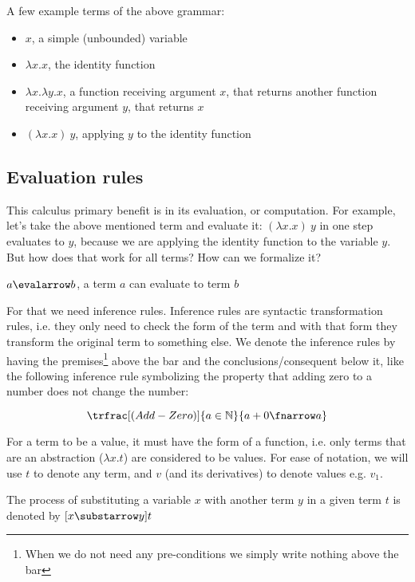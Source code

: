 A few example terms of the above grammar:

\begin{itemize}
       \item $x$, a simple (unbounded) variable
       \item $\lambda x.x$, the identity function
       \item $\lambda x.\lambda y.x$, a function receiving argument $x$, that returns another function receiving argument $y$, that returns $x$
       \item $(\lambda x.x)\ y$, applying $y$ to the identity function
\end{itemize}

\subsection{Evaluation rules}
\label{evaluation-rules}

This calculus primary benefit is in its evaluation, or computation.
For example, let's take the above mentioned term and evaluate it: $(\lambda x.x)\ y$ in one step evaluates to $y$, because we are applying the identity function to the variable $y$.
But how does that work for all terms? How can we formalize it?

\begin{definition}[Evaluation]
       $a \evalarrow b$, a term $a$ can evaluate to term $b$
\end{definition}

For that we need inference rules. Inference rules are syntactic transformation rules, i.e. they only need to check the form of the term and with that form they transform the original term to something else. We denote the inference rules by having the premises\footnote{When we do not need any pre-conditions we simply write nothing above the bar} above the bar and the conclusions/consequent below it, like the following inference rule symbolizing the property that adding zero to a number does not change the number:

\[\trfrac[(Add-Zero)]{a \in \mathbb{N}}{a+0 \fnarrow a}\]

\begin{definition}[Value]
       For a term to be a value, it must have the form of a function, i.e. only terms that are an abstraction ($\lambda x.t$) are considered to be values. For ease of notation, we will use $t$ to denote any term, and $v$ (and its derivatives) to denote values e.g. $v_1$.
\end{definition}
\begin{definition}[Substitution]
       The process of substituting a variable $x$ with another term $y$ in a given term $t$ is denoted by $[x\substarrow y]t$
\end{definition}

